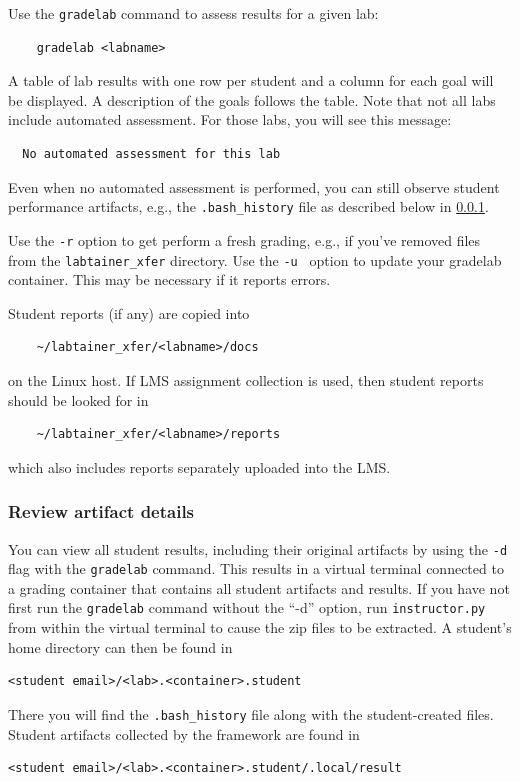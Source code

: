 \documentclass[12pt]{article}
\begin{document}
\noindent Use the {\tt gradelab} command to assess results for a given lab:
\begin{verbatim}
    gradelab <labname>
\end{verbatim}
\noindent A table of lab results with one row per student and
a column for each goal will be displayed.  A description of the goals follows the table.
Note that not all labs include automated assessment.  For those labs, you will see this
message:
\begin{verbatim}
  No automated assessment for this lab
\end{verbatim}
\noindent Even when no automated assessment is performed, you can still observe student performance
artifacts, e.g., the {\tt .bash\_history} file as described below in \ref{review-artifacts}.

Use the {\tt -r} option to get perform a fresh grading, e.g., if you've removed files from the {\tt labtainer\_xfer} directory.
Use the {\tt -u } option to update your gradelab container.  This may be necessary if it reports errors.

Student reports (if any) are  copied into 
\begin{verbatim}
    ~/labtainer_xfer/<labname>/docs
\end{verbatim}
\noindent on the Linux host.  If LMS assignment collection is used, then student reports should
be looked for in 
\begin{verbatim}
    ~/labtainer_xfer/<labname>/reports
\end{verbatim}
\noindent which also includes reports separately uploaded into the LMS.

\subsubsection{Review artifact details}
\label{review-artifacts}
You can view all student results, including their original artifacts by using the {\tt -d} flag
with the {\tt gradelab} command.  This results in a virtual terminal connected to a grading
container that contains all student artifacts and results.  If you have not first run the
{\tt gradelab} command without the ``-d'' option, run {\tt instructor.py} from within the
virtual terminal to cause the zip files to be extracted.  A student's home directory can
then be found in
\begin{verbatim}
<student email>/<lab>.<container>.student
\end{verbatim}
\noindent There you will find the {\tt .bash\_history} file along with the student-created files.
Student artifacts collected by the framework are found in 
\begin{verbatim}
<student email>/<lab>.<container>.student/.local/result
\end{verbatim}
\end{document}
